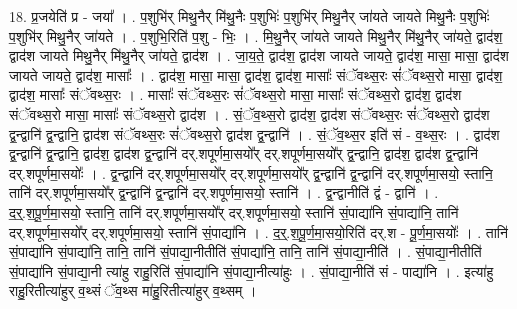 \documentclass[17pt]{extarticle}
\begin{document}
18. प्र॒जयेति॑ प्र - जया᳚ । . प॒शुभि॑र् मिथु॒नैर् मि॑थु॒नैः प॒शुभिः॑ प॒शुभि॑र् मिथु॒नैर् जा॑यते जायते मिथु॒नैः प॒शुभिः॑ प॒शुभि॑र् मिथु॒नैर् जा॑यते । . प॒शुभि॒रिति॑ प॒शु - भिः॒ । . मि॒थु॒नैर् जा॑यते जायते मिथु॒नैर् मि॑थु॒नैर् जा॑यते॒ द्वाद॑श॒ द्वाद॑श जायते मिथु॒नैर् मि॑थु॒नैर् जा॑यते॒ द्वाद॑श । . जा॒य॒ते॒ द्वाद॑श॒ द्वाद॑श जायते जायते॒ द्वाद॑श॒ मासा॒ मासा॒ द्वाद॑श जायते जायते॒ द्वाद॑श॒ मासाः᳚ । . द्वाद॑श॒ मासा॒ मासा॒ द्वाद॑श॒ द्वाद॑श॒ मासाः᳚ संॅवथ्स॒रः सं॑ॅवथ्स॒रो मासा॒ द्वाद॑श॒ द्वाद॑श॒ मासाः᳚ संॅवथ्स॒रः । . मासाः᳚ संॅवथ्स॒रः सं॑ॅवथ्स॒रो मासा॒ मासाः᳚ संॅवथ्स॒रो द्वाद॑श॒ द्वाद॑श संॅवथ्स॒रो मासा॒ मासाः᳚ संॅवथ्स॒रो द्वाद॑श । . सं॒ॅव॒थ्स॒रो द्वाद॑श॒ द्वाद॑श संॅवथ्स॒रः सं॑ॅवथ्स॒रो द्वाद॑श द्व॒न्द्वानि॑ द्व॒न्द्वानि॒ द्वाद॑श संॅवथ्स॒रः सं॑ॅवथ्स॒रो द्वाद॑श द्व॒न्द्वानि॑ । . सं॒ॅव॒थ्स॒र इति॑ सं - व॒थ्स॒रः । . द्वाद॑श द्व॒न्द्वानि॑ द्व॒न्द्वानि॒ द्वाद॑श॒ द्वाद॑श द्व॒न्द्वानि॑ दर्.शपूर्णमा॒सयो᳚र् दर्.शपूर्णमा॒सयो᳚र् द्व॒न्द्वानि॒ द्वाद॑श॒ द्वाद॑श द्व॒न्द्वानि॑ दर्.शपूर्णमा॒सयोः᳚ । . द्व॒न्द्वानि॑ दर्.शपूर्णमा॒सयो᳚र् दर्.शपूर्णमा॒सयो᳚र् द्व॒न्द्वानि॑ द्व॒न्द्वानि॑ दर्.शपूर्णमा॒सयो॒ स्तानि॒ तानि॑ दर्.शपूर्णमा॒सयो᳚र् द्व॒न्द्वानि॑ द्व॒न्द्वानि॑ दर्.शपूर्णमा॒सयो॒ स्तानि॑ । . द्व॒न्द्वानीति॑ द्वं - द्वानि॑ । . द॒र्॒.श॒पू॒र्ण॒मा॒सयो॒ स्तानि॒ तानि॑ दर्.शपूर्णमा॒सयो᳚र् दर्.शपूर्णमा॒सयो॒ स्तानि॑ सं॒पाद्या॑नि सं॒पाद्या॑नि॒ तानि॑ दर्.शपूर्णमा॒सयो᳚र् दर्.शपूर्णमा॒सयो॒ स्तानि॑ सं॒पाद्या॑नि । . द॒र्॒.श॒पू॒र्ण॒मा॒सयो॒रिति॑ दर्.श - पू॒र्ण॒मा॒सयोः᳚ । . तानि॑ सं॒पाद्या॑नि सं॒पाद्या॑नि॒ तानि॒ तानि॑ सं॒पाद्या॒नीतीति॑ सं॒पाद्या॑नि॒ तानि॒ तानि॑ सं॒पाद्या॒नीति॑ । . सं॒पाद्या॒नीतीति॑ सं॒पाद्या॑नि सं॒पाद्या॒नी त्या॑हु राहु॒रिति॑ सं॒पाद्या॑नि सं॒पाद्या॒नीत्या॑हुः । . सं॒पाद्या॒नीति॑ सं - पाद्या॑नि । . इत्या॑हु राहु॒रितीत्या॑हुर् व॒थ्सं ॅव॒थ्स मा॑हु॒रितीत्या॑हुर् व॒थ्सम् । \newline
\end{document}
